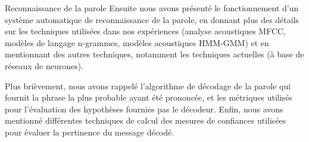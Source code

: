 \documentclass{style/these}
\begin{document}
\begin{part}{Reconnaissance de la parole}
Ensuite nous avons présenté le fonctionnement d'un système automatique de reconnaissance de la parole, en donnant plus des détails sur les techniques utilisées dans nos expériences (analyse acoustiques MFCC, modèles de langage n-grammes, modèles acoustiques \acrshort{HMM}-\acrshort{GMM}) et en mentionnant des autres techniques, notamment les techniques actuelles (à base de réseaux de neurones). 

Plus brièvement, nous avons rappelé l'algorithme de décodage de la parole qui fournit la phrase la plus probable ayant été prononcée, et les métriques utilisés pour l'évaluation des hypothèses fournies pas le décodeur. 
Enfin, nous avons mentionné différentes techniques de calcul des mesures de confiances utilisées pour évaluer la pertinence du message décodé. 




\stopcontents[parts]
\end{part}



\renewcommand{\leftmark}{}
\renewcommand{\rightmark}{}
\end{document}
